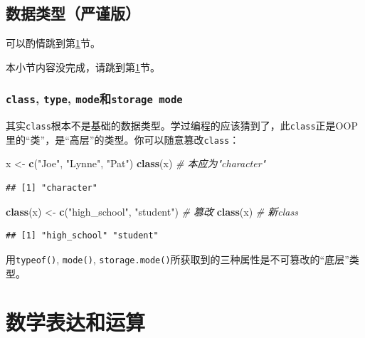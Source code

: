 \documentclass[]{book}
\newenvironment{Shaded}{\begin{snugshade}}{\end{snugshade}}
\newcommand{\CommentTok}[1]{\textcolor[rgb]{0.56,0.35,0.01}{\textit{#1}}}
\newcommand{\KeywordTok}[1]{\textcolor[rgb]{0.13,0.29,0.53}{\textbf{#1}}}
\newcommand{\NormalTok}[1]{#1}
\newcommand{\StringTok}[1]{\textcolor[rgb]{0.31,0.60,0.02}{#1}}
\begin{document}
\hypertarget{data-types-advanced}{%
\subsection{数据类型（严谨版）}\label{data-types-advanced}}

可以酌情跳到第\ref{math}节。

本小节内容没完成，请跳到第\ref{math}节。

\hypertarget{class-type-modestorage-mode}{%
\subsubsection{\texorpdfstring{\texttt{class}, \texttt{type}, \texttt{mode}和\texttt{storage\ mode}}{class, type, mode和storage mode}}\label{class-type-modestorage-mode}}

其实\texttt{class}根本不是基础的数据类型。学过编程的应该猜到了，此\texttt{class}正是OOP里的``类''，是``高层''的类型。你可以随意篡改\texttt{class}：

\begin{Shaded}
\begin{Highlighting}[]
\NormalTok{x <-}\StringTok{ }\KeywordTok{c}\NormalTok{(}\StringTok{"Joe"}\NormalTok{, }\StringTok{"Lynne"}\NormalTok{, }\StringTok{"Pat"}\NormalTok{)}
\KeywordTok{class}\NormalTok{(x) }\CommentTok{# 本应为"character"}
\end{Highlighting}
\end{Shaded}

\begin{verbatim}
## [1] "character"
\end{verbatim}

\begin{Shaded}
\begin{Highlighting}[]
\KeywordTok{class}\NormalTok{(x) <-}\StringTok{ }\KeywordTok{c}\NormalTok{(}\StringTok{"high_school"}\NormalTok{, }\StringTok{"student"}\NormalTok{) }\CommentTok{# 篡改}
\KeywordTok{class}\NormalTok{(x) }\CommentTok{# 新class}
\end{Highlighting}
\end{Shaded}

\begin{verbatim}
## [1] "high_school" "student"
\end{verbatim}

用\texttt{typeof()}, \texttt{mode()}, \texttt{storage.mode()}所获取到的三种属性是不可篡改的``底层''类型。

\hypertarget{math}{%
\section{数学表达和运算}\label{math}}
\end{document}
